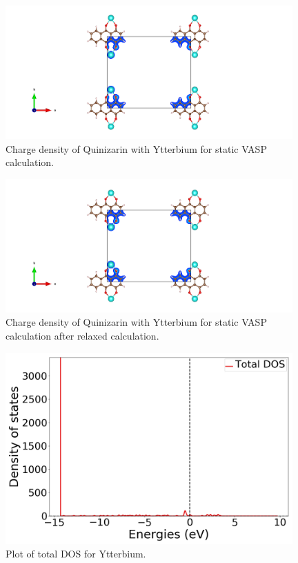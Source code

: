 \documentclass{article}
\begin{document}
  \begin{figure}[H]
      \centering
      \includegraphics[width = 11cm]{../fig/Yb_staticbefore_CHGCAR.png}
      \caption{Charge density of Quinizarin with Ytterbium for static VASP calculation. }
      \label{fig:Yb_staticbefore_CHGCAR}
  \end{figure}


  \begin{figure}[H]
      \centering
      \includegraphics[width = 11cm]{../fig/Yb_staticafter_CHGCAR.png}
      \caption{Charge density of Quinizarin with Ytterbium for static VASP calculation after relaxed calculation. }
      \label{fig:Yb_staticafter_CHGCAR}
  \end{figure}

  \begin{figure}[H]
      \centering
      \includegraphics[width = 11cm]{../fig/Yb_TDOS_1.png}
      \caption{Plot of total DOS for Ytterbium. }
      \label{fig:Yb_TDOS_1.png}
  \end{figure}
\end{document}
